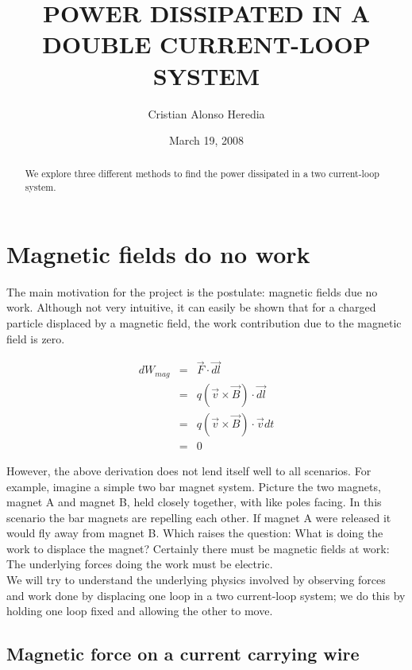 \documentclass[12pt]{revtex4}
\begin{document}
\title{POWER DISSIPATED IN A DOUBLE CURRENT-LOOP SYSTEM}
\author{Cristian Alonso Heredia}


\date{March 19, 2008}
\begin{abstract}
We explore three different methods to find the power dissipated in a two current-loop system.
\end{abstract}
\maketitle

\section{Magnetic fields do no work}

The main motivation for the project is the postulate: magnetic fields due no work. Although not very intuitive, it can easily be shown that for a charged particle displaced by a magnetic field, the work contribution due to the magnetic field is zero. 

\begin{eqnarray}
dW_{mag} &=& \label{eqn:work} \vec{F} \cdot  \vec{dl}\\ \nonumber
&=& q(\vec{v} \times \vec{B}) \cdot \vec{dl} \\  \nonumber
&=& q(\vec{v} \times \vec{B}) \cdot \vec{v}dt\\ \nonumber
&=&0
\end{eqnarray}


However, the above derivation does not lend itself well to all scenarios. For example, imagine a simple two bar magnet system. Picture the two magnets, magnet A and magnet B, held closely together, with like poles facing.  In this scenario the bar magnets are repelling each other.  If magnet A were released it would fly away from magnet B.  Which raises the question: What is doing the work to displace the magnet? Certainly there must be magnetic fields at work: The underlying forces doing the work must be electric. \\


We will try to understand the underlying physics involved by observing forces and work done by displacing one loop in a two current-loop system; we do this by holding one loop fixed and allowing the other to move.  
\subsection{Magnetic force on a current carrying wire}
\end{document}

